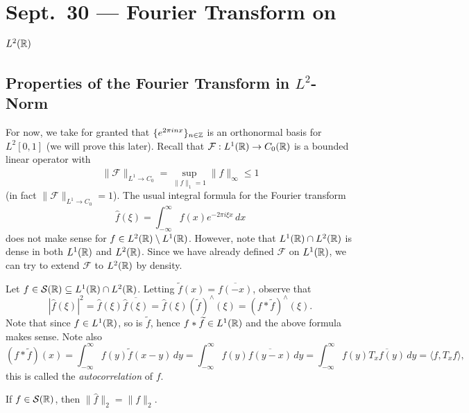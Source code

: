 \chapter{Sept.~30 --- Fourier Transform on \texorpdfstring{$L^2(\mathbb{R})$}{L2(R)}}

\section{Properties of the Fourier Transform in \texorpdfstring{$L^2$}{L2}-Norm}

\begin{remark}
  For now, we take for granted that
  $\{e^{2\pi i nx}\}_{n \in \mathbb{Z}}$ is an orthonormal
  basis for $L^2[0, 1]$ (we will prove this later).
  Recall that $\mathcal{F} : L^1(\mathbb{R}) \to C_0(\mathbb{R})$ is
  a bounded linear operator with
  \[
    \|\mathcal{F}\|_{L^1 \to C_0}
    = \sup_{\|f\|_1 = 1} \|\widehat{f}\|_\infty
    \le 1
  \]
  (in fact $\|\mathcal{F}\|_{L^1 \to C_0} = 1$).
  The usual integral formula for the Fourier transform
  \[
    \widehat{f}(\xi)
    = \int_{-\infty}^\infty f(x) e^{-2\pi i \xi x}\, dx
  \]
  does not make sense for $f \in L^2(\mathbb{R}) \setminus L^1(\mathbb{R})$.
  However, note that $L^1(\mathbb{R}) \cap L^2(\mathbb{R})$ is dense in
  both $L^1(\mathbb{R})$ and $L^2(\mathbb{R})$. Since we have already
  defined $\mathcal{F}$ on $L^1(\mathbb{R})$, we can
  try to extend $\mathcal{F}$ to $L^2(\mathbb{R})$ by density.
\end{remark}

\begin{remark}
  Let $f \in \mathcal{S}(\mathbb{R}) \subseteq L^1(\mathbb{R}) \cap L^2(\mathbb{R})$.
  Letting $\widetilde{f}(x) = \overline{f(-x)}$, observe
  that
  \[
    |\widehat{f}(\xi)|^2
    = \widehat{f}(\xi) \overline{\widehat{f}(\xi)}
    = \widehat{f}(\xi) (\widetilde{f})^\wedge(\xi)
    = (f * \widetilde{f})^\wedge(\xi).
  \]
  Note that since $f \in L^1(\mathbb{R})$, so
  is $\widetilde{f}$, hence $f * \widetilde{f} \in L^1(\mathbb{R})$
  and the above formula makes sense. Note also
  \[
    (f * \widetilde{f})(x)
    = \int_{-\infty}^\infty f(y) \widetilde{f}(x - y)\, dy
    = \int_{-\infty}^\infty f(y) \overline{f(y - x)}\, dy
    = \int_{-\infty}^\infty f(y) \overline{T_x f(y)}\, dy
    = \langle f, T_x f \rangle,
  \]
  this is called the \emph{autocorrelation} of $f$.
\end{remark}

\begin{theorem}
  If $f \in \mathcal{S}(\mathbb{R})$, then
  $\|\widehat{f}\|_2 = \|f\|_2$.
\end{theorem}

